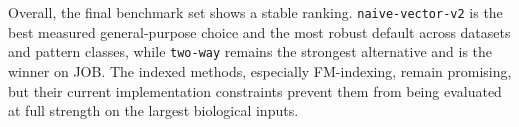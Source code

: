 \documentclass[11pt]{article}
\begin{document}
Overall, the final benchmark set shows a stable ranking. \texttt{naive-vector-v2} is the best measured general-purpose choice and the most robust default across datasets and pattern classes, while \texttt{two-way} remains the strongest alternative and is the winner on JOB. The indexed methods, especially FM-indexing, remain promising, but their current implementation constraints prevent them from being evaluated at full strength on the largest biological inputs.
\end{document}

